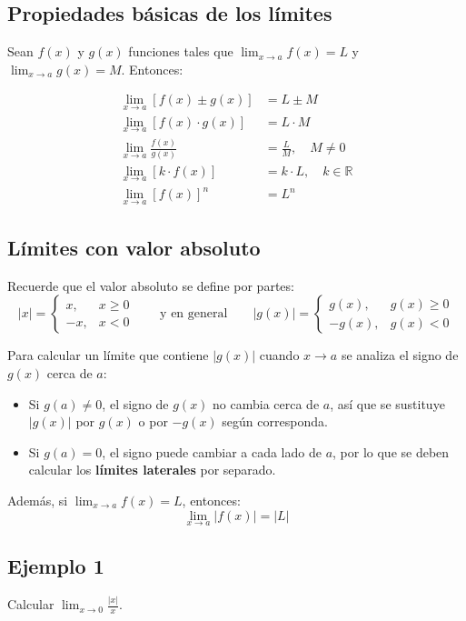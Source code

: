\documentclass[12pt]{article}
\begin{document}
\subsection{Propiedades básicas de los límites}

Sean $f(x)$ y $g(x)$ funciones tales que $\lim_{x \to a} f(x) = L$ y $\lim_{x \to a} g(x) = M$. Entonces:

\begin{align*}
\lim_{x \to a} [f(x) \pm g(x)] &= L \pm M \\
\lim_{x \to a} [f(x) \cdot g(x)] &= L \cdot M \\
\lim_{x \to a} \frac{f(x)}{g(x)} &= \frac{L}{M}, \quad M \neq 0 \\
\lim_{x \to a} [k \cdot f(x)] &= k \cdot L, \quad k \in \mathbb{R} \\
\lim_{x \to a} [f(x)]^n &= L^n
\end{align*}

\subsection{Límites con valor absoluto}

Recuerde que el valor absoluto se define por partes:
\[
|x| =
\begin{cases}
x, & x \geq 0 \\
-x, & x < 0
\end{cases}
\qquad \text{y en general} \qquad
|g(x)| =
\begin{cases}
g(x), & g(x) \geq 0 \\
-g(x), & g(x) < 0
\end{cases}
\]

Para calcular un límite que contiene $|g(x)|$ cuando $x \to a$ se analiza el signo de $g(x)$ cerca de $a$:
\begin{itemize}
    \item Si $g(a) \neq 0$, el signo de $g(x)$ no cambia cerca de $a$, así que se sustituye $|g(x)|$ por $g(x)$ o por $-g(x)$ según corresponda.
    \item Si $g(a) = 0$, el signo puede cambiar a cada lado de $a$, por lo que se deben calcular los \textbf{límites laterales} por separado.
\end{itemize}

Además, si $\displaystyle \lim_{x \to a} f(x) = L$, entonces:
\[
\lim_{x \to a} |f(x)| = |L|
\]

\subsection{Ejemplo 1}
Calcular $\displaystyle \lim_{x \to 0} \frac{|x|}{x}$.
\end{document}
